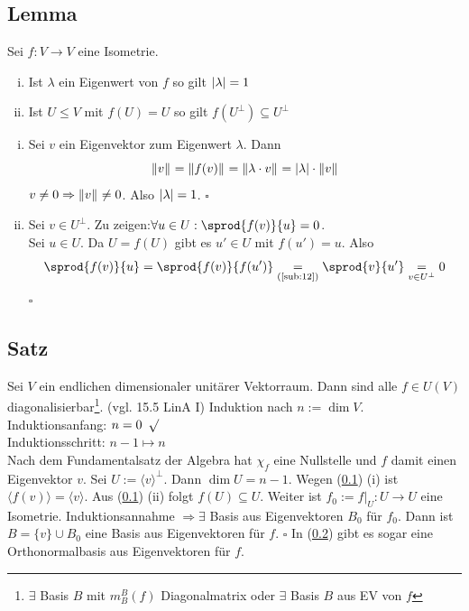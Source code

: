 \subsection[Lemma über die Eigenwerte einer Isometrie]{Lemma} %
\label{sub:112}
Sei $f : V \to V$ eine Isometrie.
\begin{enumerate}[(i)]
	\item Ist $\lambda $ ein Eigenwert von $f$ so gilt $\lvert\lambda \rvert = 1$ 
	\item Ist $U \le V$ mit $f(U)=U$ so gilt $f(U^\bot) \subseteq U^\bot$
\end{enumerate}
\begin{enumerate}[(i)]
	\item Sei $v$ ein Eigenvektor zum Eigenwert $\lambda $. Dann 
	\[
		\norm[]{v} = \norm[]{f(v)} = \norm[]{\lambda \cdot v} = \abs{\lambda } \cdot \norm[]{v}    
	\]
	$v \not= 0 \Rightarrow \norm[]{v} \not= 0 $. Also $\lvert\lambda \rvert = 1 $. \hfill \( \square \)
	\item Sei $v \in U^\bot$. Zu zeigen:$\forall u \in U : \sprod{f(v)}{u} = 0$. \\
	Sei $u \in U$. Da $U=f(U)$ gibt es $u' \in U$ mit $f(u')=u$. Also 
	\[
		\sprod{f(v)}{u} = \sprod{f(v)}{f(u')} \underset{\text{(\ref{sub:12})}}{=} \sprod{v}{u'} \underset{v \in U^\bot}{=} 0
	\] 
	\hfill \( \square \)
	
\end{enumerate}

\subsection[Satz über die Diagonalisierbarkeit von Isometrien auf unitären Vektorräumen]{Satz} %
\label{sub:113}
Sei $V$ ein endlichen dimensionaler unitärer Vektorraum. Dann sind alle $f \in U(V)$ diagonalisierbar\footnote{$\exists$ Basis $B$ mit $m_B^B(f)$ Diagonalmatrix
oder $\exists$ Basis $B$ aus EV von $f$}.
{\footnotesize (vgl. 15.5 LinA I)} 
Induktion nach $n := \dim V$. Induktionsanfang: $n=0 \enspace\surd$ \\
Induktionsschritt: $n-1 \mapsto n$ \\
Nach dem Fundamentalsatz der Algebra hat $\chi_f$ eine Nullstelle und $f$ damit einen Eigenvektor $v$. Sei $U := \langle v\rangle^\bot$. Dann $\dim U = n-1$. Wegen 
(\ref{sub:112}) (i) ist$\langle f(v)\rangle = \langle v\rangle$. Aus (\ref{sub:112}) (ii) folgt $f(U) \subseteq U$. Weiter ist $f_0 := f|_{U}  : U \to U$ eine Isometrie. 
Induktionsannahme $\Rightarrow \exists$ Basis
aus Eigenvektoren $B_0$ für $f_0$. Dann ist $B=\{v\} \cup B_0$ eine Basis aus Eigenvektoren für $f$. \hfill \( \square \)
In (\ref{sub:113}) gibt es sogar eine Orthonormalbasis aus Eigenvektoren für $f$.

